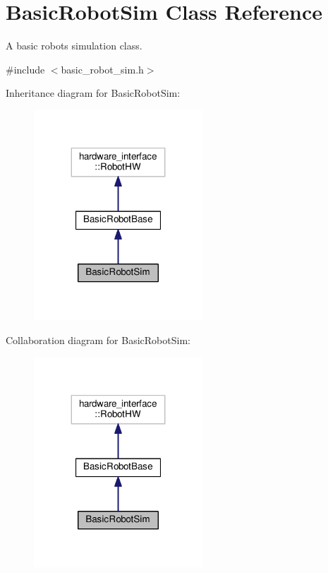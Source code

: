 \hypertarget{classBasicRobotSim}{}\section{Basic\+Robot\+Sim Class Reference}
\label{classBasicRobotSim}


A basic robot\textquotesingle{}s simulation class.  




{\ttfamily \#include $<$basic\+\_\+robot\+\_\+sim.\+h$>$}



Inheritance diagram for Basic\+Robot\+Sim\+:\nopagebreak
\begin{figure}[H]
\begin{center}
\leavevmode
\includegraphics[width=179pt]{classBasicRobotSim__inherit__graph}
\end{center}
\end{figure}


Collaboration diagram for Basic\+Robot\+Sim\+:\nopagebreak
\begin{figure}[H]
\begin{center}
\leavevmode
\includegraphics[width=179pt]{classBasicRobotSim__coll__graph}
\end{center}
\end{figure}
